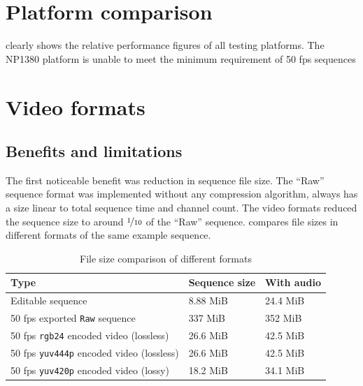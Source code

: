 \section{Platform comparison}

 clearly shows the relative performance figures of all testing platforms. The NP1380 platform is unable to meet the minimum requirement of 50 fps sequences

\section{Video formats}

\subsection{Benefits and limitations}

The first noticeable benefit  was reduction in sequence file size. The ``Raw'' sequence format was implemented without any compression algorithm,  always has a size linear to total sequence time and channel count. The video formats reduced the sequence size to around $\nicefrac{1}{10}$ of the ``Raw'' sequence.  compares file sizes in different formats of the same example sequence.

\begin{table}[t]
  \centering
  \begin{tabular}{l|l|l}
    \hline
    \textbf{Type} & \textbf{Sequence size} & \textbf{With audio} \\ \hline
    \hline
    Editable sequence                                 & 8.88 MiB  & 24.4 MiB  \\ \hline
    \hline
    50 fps exported \texttt{Raw} sequence             & 337 MiB   & 352 MiB   \\ \hline
    50 fps \texttt{rgb24} encoded video (lossless)    & 26.6 MiB  & 42.5 MiB  \\ \hline
    50 fps \texttt{yuv444p} encoded video (lossless)  & 26.6 MiB  & 42.5 MiB  \\ \hline
    50 fps \texttt{yuv420p} encoded video (lossy)     & 18.2 MiB  & 34.1 MiB  \\ \hline
  \end{tabular}
  \caption{\footnotesize File size comparison of different formats}
  \label{tbl:size}
\end{table}


